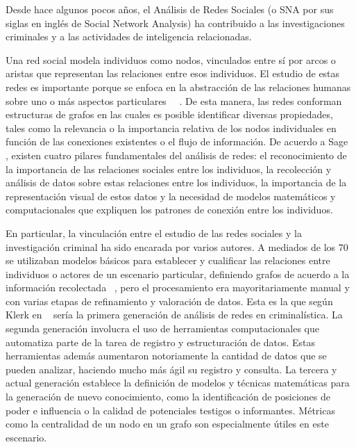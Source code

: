 
Desde hace algunos pocos años, el Análisis de Redes Sociales (o SNA por sus siglas en inglés de Social Network Analysis) ha contribuido a las investigaciones criminales y a las actividades de inteligencia relacionadas.

Una red social modela individuos como nodos, vinculados entre sí por arcos o aristas que representan las relaciones entre esos individuos. El estudio de estas redes es importante porque se enfoca en la abstracción de las relaciones humanas sobre uno o más aspectos particulares ~\cite{ref_article2}~\cite{ref_article3}. De esta manera, las redes conforman estructuras de grafos en las cuales es posible identificar diversas propiedades, tales como la relevancia o la importancia relativa de los nodos individuales  en función de las conexiones existentes o el flujo de información. De acuerdo a Sage~\cite{ref_article4} , existen cuatro pilares fundamentales del análisis de redes: el reconocimiento de la importancia de las relaciones sociales entre los individuos, la recolección y análisis de datos sobre estas relaciones entre los individuos, la importancia de la representación visual de estos datos y la necesidad de modelos matemáticos y computacionales que expliquen los patrones de conexión entre los individuos.

En particular, la vinculación entre el estudio de las redes sociales y la investigación criminal ha sido encarada por varios autores. A mediados de los 70 se utilizaban modelos básicos para establecer y cualificar las relaciones entre individuos o actores de un escenario particular, definiendo grafos de acuerdo a la información recolectada ~\cite{ref_article5}, pero el procesamiento era mayoritariamente manual y con varias etapas de refinamiento y valoración de datos. Esta es la que según Klerk en ~\cite{ref_article6} sería la primera generación de análisis de redes en criminalística. La segunda generación involucra el uso de herramientas computacionales que automatiza parte de la tarea de registro y estructuración de datos. Estas herramientas además aumentaron notoriamente la cantidad de datos que se pueden analizar, haciendo mucho más ágil su registro y consulta. La tercera y actual generación establece la definición de modelos y técnicas matemáticas para la generación de nuevo conocimiento, como la identificación de posiciones de poder e influencia o la calidad de potenciales testigos o informantes. Métricas como la centralidad de un nodo en un grafo son especialmente útiles en este escenario.

